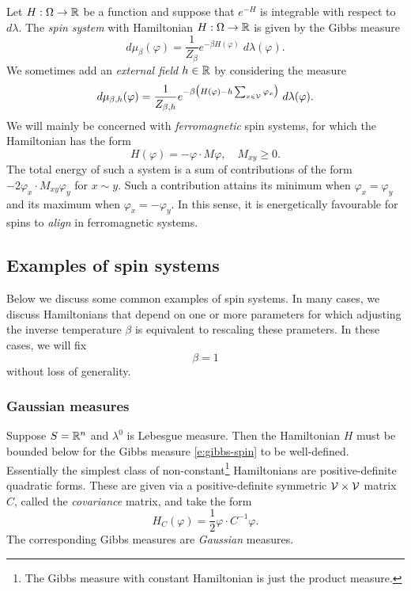 Let $H : \Omega \rightarrow {\mathbb R}$ be a function and suppose
that $e^{-H}$ is integrable with respect to $d\lambda$.
The \emph{spin system} with Hamiltonian $H : \Omega \rightarrow {\mathbb R}$ is given
by the Gibbs measure
\begin{equation}
\label{e:gibbs-spin}
d\mu_\beta(\varphi)
	=
\frac{1}{Z_\beta} e^{-\beta H(\varphi)} \; d\lambda(\varphi).
\end{equation}
We sometimes add an \emph{external field} $h \in {\mathbb R}$ by considering the measure
\begin{equation}
\label{e:gibbs-spin-ext}
d\mu_{\beta,h}(\varphi)
	=
\frac{1}{Z_{\beta,h}}
e^{-\beta \big(H(\varphi) - h \sum_{x\in\mathcal{V}} \varphi_x\big)} \; d\lambda(\varphi).
\end{equation}
We will mainly be concerned with \emph{ferromagnetic} spin systems, for which the
Hamiltonian has the form
\begin{equation}
H(\varphi) = -\varphi \cdot M\varphi,
	\quad
M_{xy} \ge 0.
\end{equation}
The total energy of such a system is a sum of contributions
of the form $-2 \varphi_x \cdot M_{xy} \varphi_y$ for $x \sim y$. Such a
contribution
attains its minimum when $\varphi_x = \varphi_y$ and its maximum when
$\varphi_x = -\varphi_y$. In this sense, it is energetically favourable
for spins to \emph{align} in ferromagnetic systems.


\subsection{Examples of spin systems}

Below we discuss some common examples of spin systems.
In many cases, we discuss Hamiltonians that depend on one or more parameters
for which adjusting the inverse temperature $\beta$ is equivalent to rescaling
these prameters. In these cases, we will fix
\begin{equation}
\label{e:beta-one}
\beta = 1
\end{equation}
without loss of generality.

\subsubsection{Gaussian measures}

Suppose $S = {\mathbb R}^n$ and $\lambda^0$ is Lebesgue measure. Then the Hamiltonian
$H$ must be bounded below for the Gibbs measure \eqref{e:gibbs-spin} to be
well-defined. Essentially the simplest class of
non-constant\footnote{The Gibbs measure with constant Hamiltonian is just the
product measure.} Hamiltonians
are positive-definite quadratic forms. These are given via a positive-definite
symmetric $\mathcal{V}\times\mathcal{V}$ matrix $C$, called the \emph{covariance}
matrix, and take the form
\begin{equation}
H_C(\varphi) = \frac{1}{2} \varphi \cdot C^{-1} \varphi.
\end{equation}
The corresponding Gibbs measures are \emph{Gaussian} measures.

